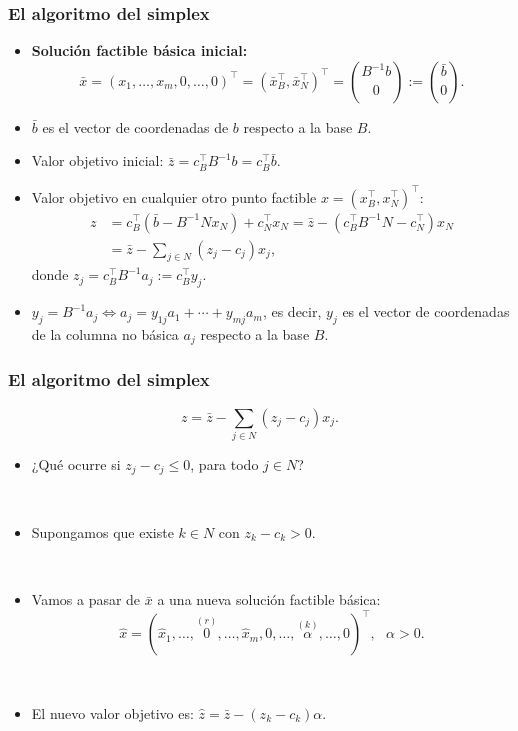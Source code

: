 \documentclass{beamer}
\begin{document}
\begin{frame}
\frametitle{El algoritmo del simplex}

\begin{itemize}
\item \textbf{Solución factible básica inicial:} 
\[
\bar{x}=(x_1,\ldots,x_m,0,\ldots,0)^\top=(\bar{x}_B^\top,\bar{x}_N^\top)^\top={B^{-1}b\choose 0}:={\bar{b}\choose 0}.
\]

\item  $\bar{b}$ es el vector de coordenadas de $b$ respecto a la base $B$.

\item Valor objetivo inicial: $\bar{z}=c^\top_B B^{-1}b=c^\top_B \bar{b}$.



\item Valor objetivo en cualquier otro punto factible $x=(x_B^\top,x_N^\top)^\top$:
\begin{align*}
z &= c_B^\top (\bar{b}-B^{-1} N x_N)+c^\top_N x_N =
 \bar{z}-(c_B^\top B^{-1} N - c_N^\top)x_N\\
  &=\bar{z}- \sum_{j\in N} (z_j-c_j)x_j,
\end{align*}
donde $z_j = c_B^\top B^{-1} a_j:= c_B^\top y_j$.



\item $y_j=B^{-1} a_j\Leftrightarrow a_j = y_{1j} a_1+\cdots + y_{mj}a_m$, es decir, $y_j$ es el vector de coordenadas de la columna no básica $a_j$ respecto a la base $B$.




\end{itemize}

\end{frame}
\begin{frame}
\frametitle{El algoritmo del simplex}

\[
z = \bar{z}- \sum_{j\in N} (z_j-c_j)x_j.
\]

\begin{itemize}
\item ¿Qué ocurre si $z_j-c_j\leq 0$, para todo $j\in N$?

\

\item Supongamos que existe $k\in N$ con $z_k-c_k>0$.

\

\item Vamos a pasar de $\bar{x}$ a una nueva solución factible básica:
\[
\hat{x} = (\hat{x}_1,\ldots,\overset{(r)}{0},\ldots,\hat{x}_m,0,\ldots,\overset{(k)}{\alpha},\ldots,0)^\top,\ \ \ \alpha>0.
\]


\

\item El nuevo valor objetivo es: $\hat{z} =  \bar{z} - (z_k-c_k)\alpha$.




\end{itemize}

\end{frame}
\end{document}
